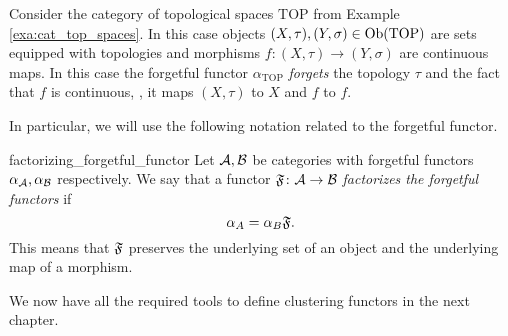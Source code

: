 \begin{example}{}{}
Consider the category of topological spaces $\mathrm{TOP}$ from Example \ref{exa:cat_top_spaces}. In this case objects $(X,\tau), (Y,\sigma) \in \mathrm {Ob}(\mathrm{TOP})$ are sets equipped with topologies and morphisms $f\colon (X,\tau) \to (Y,\sigma)$ are continuous maps.
In this case the forgetful functor $\alpha_{\mathrm{TOP}}$ \emph{forgets} the topology $\tau$ and the fact that $f$ is continuous, \ie, it maps $(X,\tau)$ to $X$ and $f$ to $f$.
\end{example}
In particular, we will use the following notation related to the forgetful functor.

\begin{definition}{}{factorizing_forgetful_functor}
Let $\mathcal{A}, \mathcal{B}$ be categories with forgetful functors $\alpha_{\mathcal{A}}, \alpha_{\mathcal{B}}$ respectively. We say that a functor $\mathfrak{F}\colon \mathcal{A} \to \mathcal{B}$ \emph{factorizes the forgetful functors} if
\begin{equation*}
    \alpha_A = \alpha_B \mathfrak{F}.
\end{equation*}
This means that $\mathfrak{F}$ preserves the underlying set of an object and the underlying map of a morphism.
\end{definition}

\medskip We now have all the required tools to define clustering functors in the next chapter.